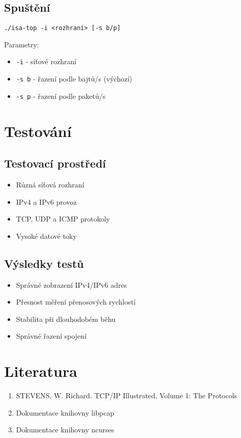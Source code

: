 \documentclass[a4paper,11pt]{article}
\theoremstyle{definition}
\begin{document}
\subsection{Spuštění}
\begin{verbatim}
./isa-top -i <rozhraní> [-s b/p]
\end{verbatim}

Parametry:
\begin{itemize}
    \item \texttt{-i} - síťové rozhraní
    \item \texttt{-s b} - řazení podle bajtů/s (výchozí)
    \item \texttt{-s p} - řazení podle paketů/s
\end{itemize}

\section{Testování}
\subsection{Testovací prostředí}
\begin{itemize}
    \item Různá síťová rozhraní
    \item IPv4 a IPv6 provoz
    \item TCP, UDP a ICMP protokoly
    \item Vysoké datové toky
\end{itemize}

\subsection{Výsledky testů}
\begin{itemize}
    \item Správné zobrazení IPv4/IPv6 adres
    \item Přesnost měření přenosových rychlostí
    \item Stabilita při dlouhodobém běhu
    \item Správné řazení spojení
\end{itemize}

\section{Literatura}
\begin{enumerate}
    \item STEVENS, W. Richard. TCP/IP Illustrated, Volume 1: The Protocols
    \item Dokumentace knihovny libpcap
    \item Dokumentace knihovny ncurses
\end{enumerate}
\end{document}
